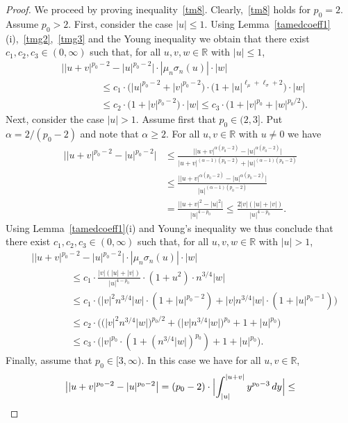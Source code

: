 \documentclass[11pt]{amsart}
\newcommand{\R}{{\mathbb R}}
\theoremstyle{plain}
\theoremstyle{definition}
\begin{document}
\begin{proof}
We proceed by proving inequality~\eqref{tm8}. Clearly,~\eqref{tm8} holds for $p_0=2$. Assume  $p_0>2$. First,  consider the case  $|u|\le 1$. Using  Lemma~\ref{tamedcoeff1}(i),~\eqref{tmg2},~\eqref{tmg3}
and the Young inequality we obtain that there exist $c_1, c_2, c_3\in (0,\infty)$ such that,  for all $u,v,w\in\R$ with  $|u|\le 1$,
\begin{align*}
& \bigl||u+v|^{p_0-2} - |u|^{p_0-2}\bigr| \cdot|\mu_n\sigma_n(u)|\cdot|w|\\
&\qquad\qquad\le c_1\cdot \bigl(|u|^{p_0-2}+|v|^{p_0-2}\bigr)\cdot \bigl(1+|u|^{\ell_\mu+\ell_\sigma+2}\bigr)\cdot|w|\\
&  \qquad\qquad \le c_{2}\cdot\bigl(1+|v|^{p_0-2}\bigr)\cdot |w| \le c_3\cdot \bigl(1+|v|^{p_0}+|w|^{p_0/2}\bigr).
\end{align*}
 Next,  consider the case $|u|> 1$. Assume first that $p_0\in (2,3]$. Put $\alpha=2/(p_0-2)$ and note that $\alpha\ge 2$. For all  $u,v\in\R$ with  $u\not=0$ we have
\begin{align*}
\bigl||u+v|^{p_0-2} - |u|^{p_0-2}\bigr| & \le \frac{\bigl||u+v|^{\alpha(p_0-2)} - |u|^{\alpha(p_0-2)}\bigr|}{|u+v|^{(\alpha-1)(p_0-2)}+|u|^{(\alpha-1)(p_0-2)}}\\
& \le \frac{\bigl||u+v|^{\alpha(p_0-2)} - |u|^{\alpha(p_0-2)}\bigr|}{|u|^{(\alpha-1)(p_0-2)}}\\
&  = \frac{\bigl||u+v|^{2} - |u|^{2}\bigr|}{|u|^{4-p_0}}\le \frac{2|v|(|u| + |v|)}{|u|^{4-p_0}}.
\end{align*}
Using Lemma~\ref{tamedcoeff1}(i) and
Young's inequality we thus conclude that there exist $c_1, c_2, c_3\in (0,\infty)$ such that,  for all $u,v,w\in\R$ with  $|u|> 1$,
\begin{align*}
& \bigl||u+v|^{p_0-2} - |u|^{p_0-2}\bigr|\cdot|\mu_n\sigma_n(u)|\cdot |w|\\
 &\qquad\qquad \le c_1\cdot \frac{|v|(|u| + |v|)}{|u|^{4-p_0}}\cdot (1+u^2)\cdot n^{3/4} |w|\\
& \qquad\qquad \le c_1\cdot \bigl(|v|^{2}n^{3/4}|w|\cdot (1+|u|^{p_0-2}) + |v|n^{3/4}|w|\cdot(1+|u|^{p_0-1})\bigr)\\
&\qquad\qquad \le c_{2}\cdot \bigl(\bigl(|v|^{2}n^{3/4}|w|\bigr)^{p_0/2} + \bigl(|v|n^{3/4}|w|\bigr)^{p_0} + 1 + |u|^{p_0}\bigr)\\
&\qquad\qquad \le c_{3}\cdot \bigl(|v|^{p_0}\cdot (1+(n^{3/4}|w|)^{p_0})  + 1 + |u|^{p_0}\bigr).
\end{align*}
Finally, assume that  $p_0\in [3,\infty)$. In this case we have for all $u, v\in\R$,
\[
\bigl||u+v|^{p_0-2} - |u|^{p_0-2}\bigr| = (p_0-2)\cdot \Bigl|\int_{|u|}^{|u+v|} y^{p_0-3}\, dy \Bigr|\le
\]
\end{proof}
\end{document}
